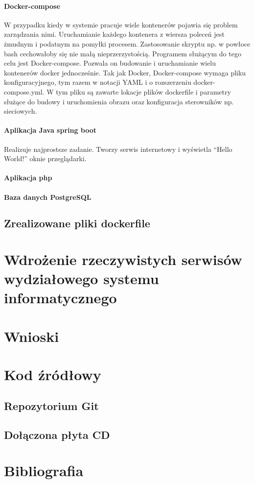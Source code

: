 \documentclass[polish, a4paper, 12pt, oneside]{book}
\begin{document}
\subsubsection{Docker-compose}
W przypadku kiedy w systemie pracuje wiele kontenerów pojawia się problem zarządzania nimi. Uruchamianie każdego kontenera z wiersza poleceń jest żmudnym i podatnym na pomyłki procesem. Zastosowanie skryptu np. w powłoce bash cechowałoby się nie małą nieprzerzystością. Programem służącym do tego celu jest Docker-compose. Pozwala on budowanie i uruchamianie wielu kontenerów docker jednocześnie. Tak jak Docker, Docker-compose wymaga pliku konfiguracyjnego, tym razem w notacji YAML i o rozszerzeniu docker-compose.yml. W tym pliku są zawarte lokacje plików dockerfile i parametry służące do budowy i uruchomienia obrazu oraz konfiguracja sterowników np. sieciowych. 
\subsubsection{Aplikacja Java spring boot}
Realizuje najprostsze zadanie. Tworzy serwis internetowy i wyświetla ``Hello World!'' oknie przeglądarki.
\subsubsection{Aplikacja php}

\subsubsection{Baza danych PostgreSQL}

\section{Zrealizowane pliki dockerfile}

\chapter{Wdrożenie rzeczywistych serwisów wydziałowego systemu informatycznego}

\chapter{Wnioski}

\chapter{Kod źródłowy}
\section{Repozytorium Git}
\section{Dołączona płyta CD}

\chapter{Bibliografia}
\end{document}

